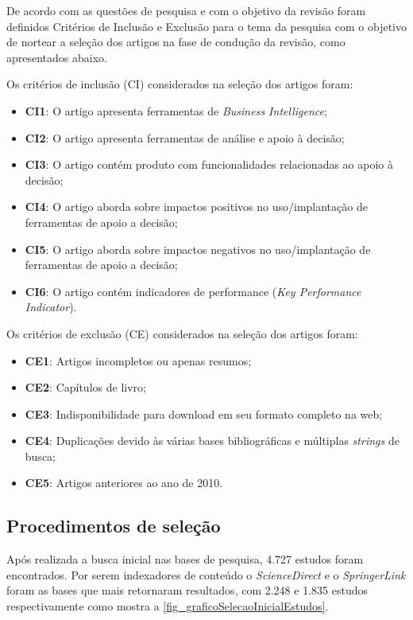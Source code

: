 De acordo com as questões de pesquisa e com o objetivo da revisão foram definidos
Critérios de Inclusão e Exclusão para o tema da pesquisa com o objetivo de nortear a seleção dos artigos na fase de condução da revisão, como apresentados abaixo.

Os critérios de inclusão (CI) considerados na seleção dos artigos foram:
\begin{itemize}
    \item \textbf{CI1}: O artigo apresenta ferramentas de \textit{Business Intelligence};
    \item \textbf{CI2}: O artigo apresenta ferramentas de análise e apoio à decisão;
    \item \textbf{CI3}: O artigo contém produto com funcionalidades relacionadas ao apoio à decisão;
    \item \textbf{CI4}: O artigo aborda sobre impactos positivos no uso/implantação de ferramentas de apoio a decisão;
    \item \textbf{CI5}: O artigo aborda sobre impactos negativos no uso/implantação de ferramentas de apoio a decisão;
    \item \textbf{CI6}: O artigo contém indicadores de performance (\textit{Key Performance Indicator}).
\end{itemize}

Os critérios de exclusão (CE) considerados na seleção dos artigos foram:
\begin{itemize}
    \item \textbf{CE1}: Artigos incompletos ou apenas resumos;
    \item \textbf{CE2}: Capítulos de livro;
    \item \textbf{CE3}: Indisponibilidade para download em seu formato completo na web;
    \item \textbf{CE4}: Duplicações devido às várias bases bibliográficas e múltiplas \textit{strings} de busca;
    \item \textbf{CE5}: Artigos anteriores ao ano de 2010.
\end{itemize}


\subsection{Procedimentos de seleção}

Após realizada a busca inicial nas bases de pesquisa, 4.727 estudos foram encontrados. Por serem indexadores de conteúdo o \textit{ScienceDirect} e o \textit{SpringerLink} foram as bases que mais retornaram resultados, com 2.248 e 1.835 estudos respectivamente como mostra a \autoref{fig_graficoSelecaoInicialEstudos}.

